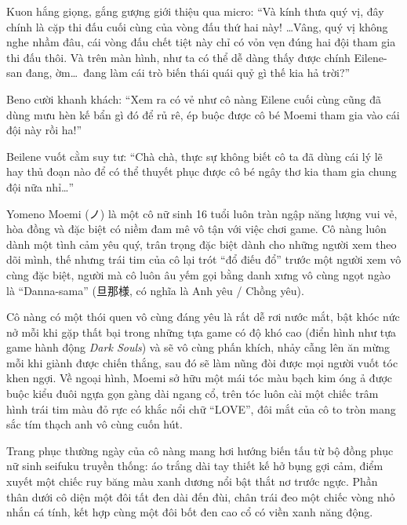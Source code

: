 \documentclass[../main.tex]{subfiles}
\begin{document}

Kuon hắng giọng, gắng gượng giới thiệu qua micro: ``Và kính thưa quý vị, đây chính là cặp thi đấu cuối cùng của vòng đấu thứ hai này! \dots Vâng, quý vị không nghe nhầm đâu, cái vòng đấu chết tiệt này chỉ có vỏn vẹn đúng hai đội tham gia thi đấu thôi. Và trên màn hình, như ta có thể dễ dàng thấy được chính Eilene-san đang, ờm\dots\ đang làm cái trò biến thái quái quỷ gì thế kia hả trời?''

Beno cười khanh khách: ``Xem ra có vẻ như cô nàng Eilene cuối cùng cũng đã dùng mưu hèn kế bẩn gì đó để rủ rê, ép buộc được cô bé Moemi tham gia vào cái đội này rồi ha!''

Beilene vuốt cằm suy tư: ``Chà chà, thực sự không biết cô ta đã dùng cái lý lẽ hay thủ đoạn nào để có thể thuyết phục được cô bé ngây thơ kia tham gia chung đội nữa nhỉ\dots''

\chrint

Yomeno Moemi (ノ) là một cô nữ sinh 16 tuổi luôn tràn ngập năng lượng vui vẻ, hòa đồng và đặc biệt có niềm đam mê vô tận với việc chơi game. Cô nàng luôn dành một tình cảm yêu quý, trân trọng đặc biệt dành cho những người xem theo dõi mình, thế nhưng trái tim của cô lại trót ``đổ điếu đổ'' trước một người xem vô cùng đặc biệt, người mà cô luôn âu yếm gọi bằng danh xưng vô cùng ngọt ngào là ``Danna-sama'' (旦那様, có nghĩa là Anh yêu / Chồng yêu).

Cô nàng có một thói quen vô cùng đáng yêu là rất dễ rơi nước mắt, bật khóc nức nở mỗi khi gặp thất bại trong những tựa game có độ khó cao (điển hình như tựa game hành động \textit{Dark Souls}) và sẽ vô cùng phấn khích, nhảy cẫng lên ăn mừng mỗi khi giành được chiến thắng, sau đó sẽ làm nũng đòi được mọi người vuốt tóc khen ngợi. Về ngoại hình, Moemi sở hữu một mái tóc màu bạch kim óng ả được buộc kiểu đuôi ngựa gọn gàng dài ngang cổ, trên tóc luôn cài một chiếc trâm hình trái tim màu đỏ rực có khắc nổi chữ ``LOVE'', đôi mắt của cô to tròn mang sắc tím thạch anh vô cùng cuốn hút.

Trang phục thường ngày của cô nàng mang hơi hướng biến tấu từ bộ đồng phục nữ sinh seifuku truyền thống: áo trắng dài tay thiết kế hở bụng gợi cảm, điểm xuyết một chiếc ruy băng màu xanh dương nổi bật thắt nơ trước ngực. Phần thân dưới cô diện một đôi tất đen dài đến đùi, chân trái đeo một chiếc vòng nhỏ nhắn cá tính, kết hợp cùng một đôi bốt đen cao cổ có viền xanh năng động.

\chrint
\end{document}
